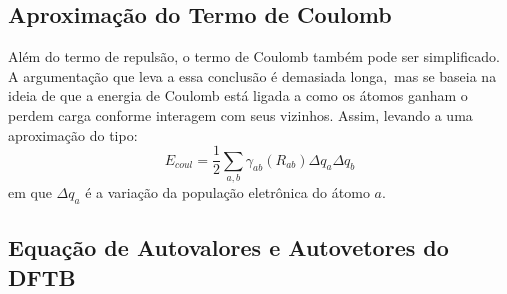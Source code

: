 \subsection{Aproximação do Termo de Coulomb}

Além do termo de repulsão, o termo de Coulomb também pode ser simplificado. A argumentação que leva a essa conclusão é demasiada longa,\
mas se baseia na ideia de que a energia de Coulomb está ligada a como os átomos ganham o perdem carga conforme interagem com seus vizinhos. Assim, levando a uma aproximação do tipo:
\begin{equation}
    E_{coul} = \frac{1}{2}\sum_{a,b}\gamma_{ab}(R_{ab})\Delta q_a \Delta q_b
\end{equation}
em que $\Delta q_a$ é a variação da população eletrônica do átomo $a$.

\subsection{Equação de Autovalores e Autovetores do DFTB}

